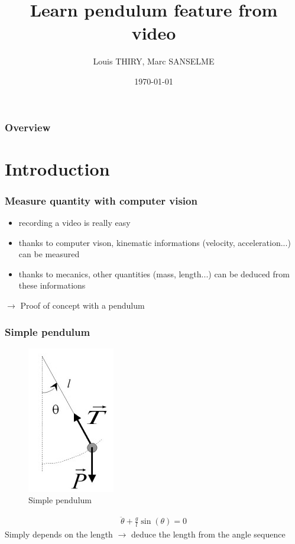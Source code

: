 \documentclass{beamer}
\title[Project Object Recognition]{Learn pendulum feature from video}
\author{Louis THIRY, Marc SANSELME}
\institute[MVA]
{ENS-Cachan}
\date{\today}
\begin{document}
\begin{frame}
\titlepage
\end{frame}

\begin{frame}
\frametitle{Overview}
\tableofcontents
\end{frame}


\section{Introduction}

\begin{frame}
\frametitle{Measure quantity with computer vision}
\begin{itemize}
  \item recording a video is really easy
  \item thanks to computer vison, kinematic informations (velocity, acceleration...) can be measured
  \item thanks to mecanics, other quantities (mass, length...) can be deduced from these informations
\end{itemize}
$\rightarrow$ Proof of concept with a pendulum
\end{frame}

\begin{frame}
\frametitle{Simple pendulum}
\begin{figure}
  \captionsetup{labelformat=empty}
  \includegraphics{pendule.jpg}
  \caption{Simple pendulum}
\end{figure}
\begin{align*}
  \ddot{\theta} + \frac{g}{l} \sin (\theta) = 0
\end{align*}
Simply depends on the length $\rightarrow$ deduce the length from the angle sequence
\end{frame}
\end{document}
